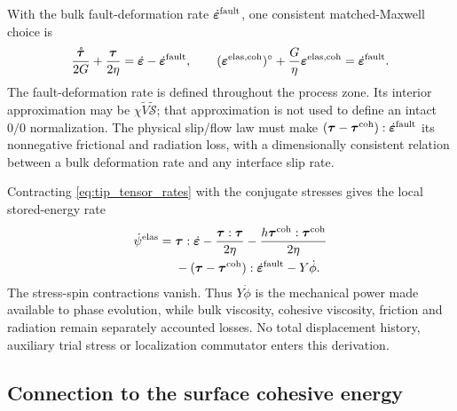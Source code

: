 \documentclass[10pt,a4paper]{article}
\begin{document}
With the bulk fault-deformation rate $\dot{\bm\varepsilon}^{\rm fault}$,
one consistent matched-Maxwell choice is
\begin{equation}
 \frac{\mathring{\bm\tau}}{2G}+\frac{\bm\tau}{2\eta}
   =\dot{\bm\varepsilon}-\dot{\bm\varepsilon}^{\rm fault},
 \qquad
 (\bm\varepsilon^{\rm elas,coh})^\circ
     +\frac{G}{\eta}\bm\varepsilon^{\rm elas,coh}
   =\dot{\bm\varepsilon}^{\rm fault}.
 \label{eq:tip_tensor_rates}
\end{equation}
The fault-deformation rate is defined throughout the process zone. Its
interior approximation may be $\chi\widetilde V\widetilde{\bm{\mathcal S}}$;
that approximation is not used to define an intact $0/0$ normalization.
The physical slip/flow law must make
$(\bm\tau-\bm\tau^{\rm coh}):\dot{\bm\varepsilon}^{\rm fault}$
its nonnegative frictional and radiation loss, with a dimensionally consistent
relation between a bulk deformation rate and any interface slip rate.

Contracting \eqref{eq:tip_tensor_rates} with the conjugate stresses gives the
local stored-energy rate
\begin{equation}
 \begin{split}
 \dot\psi^{\rm elas}={}&\bm\tau:\dot{\bm\varepsilon}
 -\frac{\bm\tau:\bm\tau}{2\eta}
 -\frac{h\bm\tau^{\rm coh}:\bm\tau^{\rm coh}}{2\eta}\\
 &-(\bm\tau-\bm\tau^{\rm coh}):\dot{\bm\varepsilon}^{\rm fault}
 -Y\dot\phi.
 \end{split}
 \label{eq:tip_local_power}
\end{equation}
The stress-spin contractions vanish. Thus $Y\dot\phi$ is the mechanical
power made available to phase evolution, while bulk viscosity, cohesive
viscosity, friction and radiation remain separately accounted losses.
No total displacement history, auxiliary trial stress or localization
commutator enters this derivation.

\subsection{Connection to the surface cohesive energy}
\end{document}
